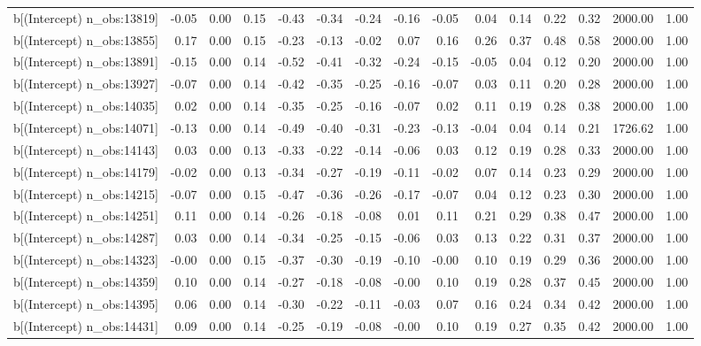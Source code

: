 \begin{table}[ht]
\begin{tabular}{rrrrrrrrrrrrrrr}
  b[(Intercept) n\_obs:13819] & -0.05 & 0.00 & 0.15 & -0.43 & -0.34 & -0.24 & -0.16 & -0.05 & 0.04 & 0.14 & 0.22 & 0.32 & 2000.00 & 1.00 \\ 
  b[(Intercept) n\_obs:13855] & 0.17 & 0.00 & 0.15 & -0.23 & -0.13 & -0.02 & 0.07 & 0.16 & 0.26 & 0.37 & 0.48 & 0.58 & 2000.00 & 1.00 \\ 
  b[(Intercept) n\_obs:13891] & -0.15 & 0.00 & 0.14 & -0.52 & -0.41 & -0.32 & -0.24 & -0.15 & -0.05 & 0.04 & 0.12 & 0.20 & 2000.00 & 1.00 \\ 
  b[(Intercept) n\_obs:13927] & -0.07 & 0.00 & 0.14 & -0.42 & -0.35 & -0.25 & -0.16 & -0.07 & 0.03 & 0.11 & 0.20 & 0.28 & 2000.00 & 1.00 \\ 
  b[(Intercept) n\_obs:14035] & 0.02 & 0.00 & 0.14 & -0.35 & -0.25 & -0.16 & -0.07 & 0.02 & 0.11 & 0.19 & 0.28 & 0.38 & 2000.00 & 1.00 \\ 
  b[(Intercept) n\_obs:14071] & -0.13 & 0.00 & 0.14 & -0.49 & -0.40 & -0.31 & -0.23 & -0.13 & -0.04 & 0.04 & 0.14 & 0.21 & 1726.62 & 1.00 \\ 
  b[(Intercept) n\_obs:14143] & 0.03 & 0.00 & 0.13 & -0.33 & -0.22 & -0.14 & -0.06 & 0.03 & 0.12 & 0.19 & 0.28 & 0.33 & 2000.00 & 1.00 \\ 
  b[(Intercept) n\_obs:14179] & -0.02 & 0.00 & 0.13 & -0.34 & -0.27 & -0.19 & -0.11 & -0.02 & 0.07 & 0.14 & 0.23 & 0.29 & 2000.00 & 1.00 \\ 
  b[(Intercept) n\_obs:14215] & -0.07 & 0.00 & 0.15 & -0.47 & -0.36 & -0.26 & -0.17 & -0.07 & 0.04 & 0.12 & 0.23 & 0.30 & 2000.00 & 1.00 \\ 
  b[(Intercept) n\_obs:14251] & 0.11 & 0.00 & 0.14 & -0.26 & -0.18 & -0.08 & 0.01 & 0.11 & 0.21 & 0.29 & 0.38 & 0.47 & 2000.00 & 1.00 \\ 
  b[(Intercept) n\_obs:14287] & 0.03 & 0.00 & 0.14 & -0.34 & -0.25 & -0.15 & -0.06 & 0.03 & 0.13 & 0.22 & 0.31 & 0.37 & 2000.00 & 1.00 \\ 
  b[(Intercept) n\_obs:14323] & -0.00 & 0.00 & 0.15 & -0.37 & -0.30 & -0.19 & -0.10 & -0.00 & 0.10 & 0.19 & 0.29 & 0.36 & 2000.00 & 1.00 \\ 
  b[(Intercept) n\_obs:14359] & 0.10 & 0.00 & 0.14 & -0.27 & -0.18 & -0.08 & -0.00 & 0.10 & 0.19 & 0.28 & 0.37 & 0.45 & 2000.00 & 1.00 \\ 
  b[(Intercept) n\_obs:14395] & 0.06 & 0.00 & 0.14 & -0.30 & -0.22 & -0.11 & -0.03 & 0.07 & 0.16 & 0.24 & 0.34 & 0.42 & 2000.00 & 1.00 \\ 
  b[(Intercept) n\_obs:14431] & 0.09 & 0.00 & 0.14 & -0.25 & -0.19 & -0.08 & -0.00 & 0.10 & 0.19 & 0.27 & 0.35 & 0.42 & 2000.00 & 1.00 \\ 

\end{tabular}
\end{table}

